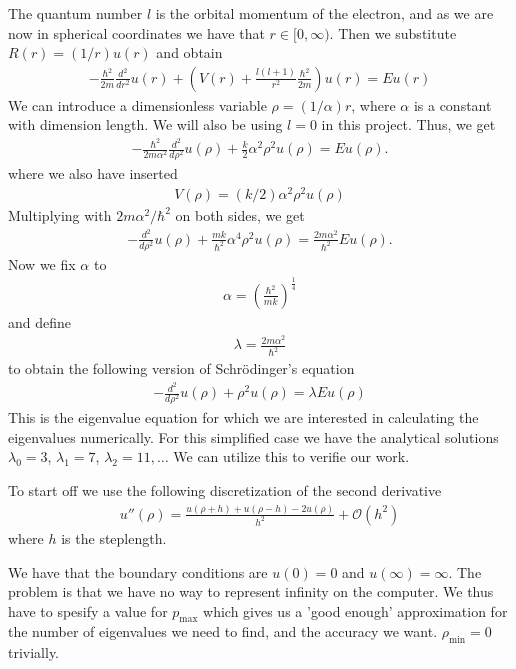 \documentclass[11pt, a4paper]{article}
\begin{document}
The quantum number $l$ is the orbital momentum of the electron, and as we are now in spherical coordinates we have that $r \in [0,\infty)$.  
%
Then we substitute $R(r) = (1/r) u(r)$ and obtain
%
\begin{gather}
  -\frac{\hbar^2}{2 m} \frac{d^2}{dr^2} u(r) 
       + \left ( V(r) + \frac{l (l + 1)}{r^2}\frac{\hbar^2}{2 m}
                                    \right ) u(r) = E u(r)
\end{gather}
We can introduce a dimensionless variable $\rho = (1/\alpha)r$, where $\alpha$ is a constant with dimension length. We will also be using $l=0$ in this project. Thus, we get
\begin{gather}
  -\frac{\hbar^2}{2 m \alpha^2} \frac{d^2}{d\rho^2} u(\rho) 
       + \frac{k}{2} \alpha^2\rho^2u(\rho)  = E u(\rho) .
\end{gather}
where we also have inserted 
\begin{gather}
V(\rho) = (k/2)\alpha^2\rho^2u(\rho)
\end{gather}
Multiplying with $2m\alpha^2/\hbar^2$ on both sides, we get
\begin{gather}
-\frac{d^2}{d\rho^2} u(\rho) 
       + \frac{mk}{\hbar^2} \alpha^4\rho^2u(\rho)  = \frac{2m\alpha^2}{\hbar^2}E u(\rho) .
\end{gather}
Now we fix $\alpha$ to
\begin{gather}
\alpha = \left(\frac{\hbar^2}{mk}\right)^\frac{1}{4}
\end{gather}
and define
\begin{gather}
\lambda = \frac{2m\alpha^2}{\hbar^2}
\end{gather}
to obtain the following version of Schr\"odinger's equation
\begin{gather}
-\frac{d^2}{d\rho^2}u(\rho) +\rho^2u(\rho) = \lambda Eu(\rho)
\end{gather}
This is the eigenvalue equation for which we are interested in calculating the eigenvalues numerically. For this simplified case we have the analytical solutions $\lambda_0 = 3$, $\lambda_1 = 7$, $\lambda_2 = 11,\dots$ We can utilize this to verifie our work.

To start off we use the following discretization of the second derivative
\begin{gather}
u''(\rho) = \frac{u(\rho+h)+u(\rho-h)-2u(\rho)}{h^2}+\mathcal{O}(h^2)
\end{gather}
where $h$ is the steplength.

We have that the boundary conditions are $u(0) = 0$ and $u(\infty) = \infty$. The problem is that we have no way to represent infinity on the computer. We thus have to spesify a value for $p_\text{max}$ which gives us a 'good enough' approximation for the number of eigenvalues we need to find, and the accuracy we want. $\rho_\text{min} = 0$ trivially.
\end{document}
